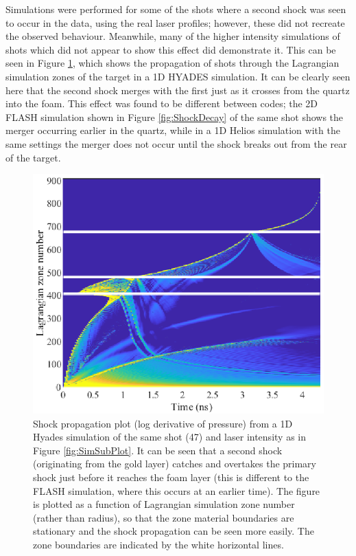 Simulations were performed for some of the shots where a second shock was seen to occur in the data, using the real laser profiles; however, these did not recreate the observed behaviour. Meanwhile, many of the higher intensity simulations of shots which did not appear to show this effect did demonstrate it. This can be seen in Figure \ref{fig:ShockPlot}, which shows the propagation of shots through the Lagrangian simulation zones of the target in a 1D HYADES simulation. It can be clearly seen here that the second shock merges with the first just as it crosses from the quartz into the foam. This effect was found to be different between codes; the 2D FLASH simulation shown in Figure \ref{fig:ShockDecay} of the same shot shows the merger occurring earlier in the quartz, while in a 1D Helios simulation with the same settings the merger does not occur until the shock breaks out from the rear of the target.

\begin{figure}
\begin{centering}
\includegraphics{figures/Experiment/ShockPlot2.eps}%
\caption{\label{fig:ShockPlot} Shock propagation plot (log derivative of pressure) from a 1D Hyades simulation of the same shot (47) and laser intensity as in Figure \ref{fig:SimSubPlot}. It can be seen that a second shock (originating from the gold layer) catches and overtakes the primary shock just before it reaches the foam layer (this is different to the FLASH simulation, where this occurs at an earlier time). The figure is plotted as a function of Lagrangian simulation zone number (rather than radius), so that the zone material boundaries are stationary and the shock propagation can be seen more easily. The zone boundaries are indicated by the white horizontal lines.}
\end{centering}
\end{figure}

